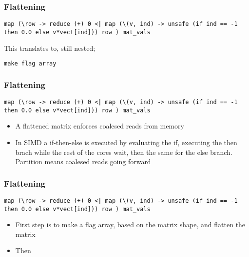 \documentclass{beamer}
\begin{document}
\begin{frame}[fragile]
  \frametitle{Flattening}
  \begin{lstlisting}[frame=single, language=Futhark]
    map (\row -> reduce (+) 0 <| map (\(v, ind) -> unsafe (if ind == -1 then 0.0 else v*vect[ind])) row ) mat_vals
  \end{lstlisting}
  This translates to, still nested;
  \begin{lstlisting}[frame=single, language=Futhark]
    make flag array

  \end{lstlisting}
\end{frame}

\begin{frame}[fragile]
  \frametitle{Flattening}

  \begin{lstlisting}[frame=single, language=Futhark]
    map (\row -> reduce (+) 0 <| map (\(v, ind) -> unsafe (if ind == -1 then 0.0 else v*vect[ind])) row ) mat_vals
  \end{lstlisting}
  \begin{itemize}
    \item A flattened matrix enforces coalesed reads from memory
    \item In SIMD a if-then-else is executed by evaluating the if, executing the then brach while the rest of the cores wait, then the same for the else branch. Partition means coalesed reads going forward
  \end{itemize}
\end{frame}

\begin{frame}[fragile]
  \frametitle{Flattening}
  \begin{lstlisting}[frame=single, language=Futhark]
    map (\row -> reduce (+) 0 <| map (\(v, ind) -> unsafe (if ind == -1 then 0.0 else v*vect[ind])) row ) mat_vals
  \end{lstlisting}
  \begin{itemize}
    \item First step is to make a flag array, based on the matrix shape, and flatten the matrix
    \item Then
  \end{itemize}
\end{frame}

 \begin{frame}
 \nocite{*}
 
 
 \end{frame}
\end{document}
